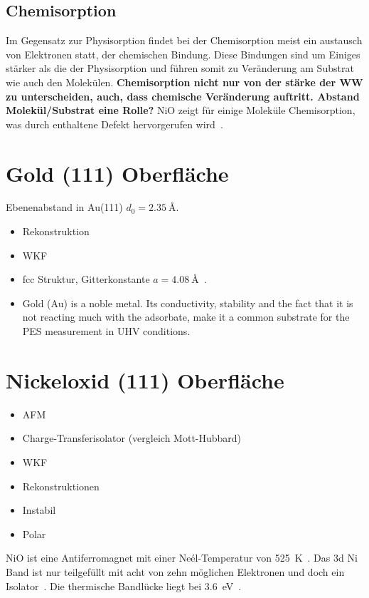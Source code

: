         
        \subsection{Chemisorption}
            Im Gegensatz zur Physisorption findet bei der Chemisorption meist ein austausch von Elektronen statt, der chemischen Bindung.
            Diese Bindungen sind um Einiges stärker als die der Physisorption und führen somit zu Veränderung am Substrat wie auch den Molekülen.
            \textbf{Chemisorption nicht nur von der stärke der WW zu unterscheiden, auch, dass chemische Veränderung auftritt.
            Abstand Molekül/Substrat eine Rolle?}
            NiO zeigt für einige Moleküle Chemisorption, was durch enthaltene Defekt hervorgerufen wird~\cite{kunz_chemisorption_1985}.
            
    \section{Gold (111) Oberfläche}
        \textbf{\cite{5A_1}}
        Ebenenabstand in Au(111) $d_0 = \SI{2.35}{\angstrom}$.

        \begin{itemize}
            \item Rekonstruktion
            \item WKF
            \item fcc Struktur, Gitterkonstante  $a=\SI{4.08}{\angstrom}$~\cite{Marx}.
            \item Gold (Au) is a noble metal. Its conductivity, stability and the fact that it is not reacting much with the adsorbate, make it a common substrate for the PES measurement in UHV conditions.
        \end{itemize}


    \section{Nickeloxid (111) Oberfläche}
        \begin{itemize}
            \item AFM
            \item Charge-Transferisolator (vergleich Mott-Hubbard)
            \item WKF
            \item Rekonstruktionen
            \item Instabil
            \item Polar
        \end{itemize}
        NiO ist eine Antiferromagnet mit einer Neél-Temperatur von \SI{525}{\kelvin}~\cite{kunz_chemisorption_1985}.
        Das 3d Ni Band ist nur teilgefüllt mit acht von zehn möglichen Elektronen und doch ein Isolator~\cite{kunz_chemisorption_1985}.
        Die thermische Bandlücke liegt bei \SI{3.6}{\electronvolt}~\cite{kunz_chemisorption_1985}.

